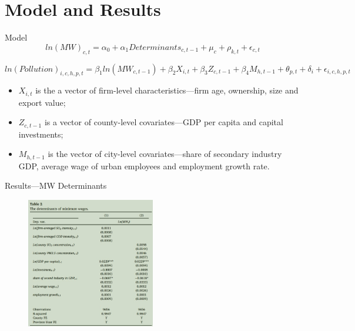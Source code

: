 \documentclass[aspectratio = 169]{beamer}
\begin{document}
%        


    \section{Model and Results}\label{sec:model-and-results}
    \begin{frame}{Model}
        \begin{equation}
            ln(MW)_{c,t} = \alpha_0 + \alpha_{1}Determinants_{c,t-1} + \mu_c + \rho_{k,t} + \epsilon_{c,t}\label{eq:determinants-mw}
        \end{equation}

        \begin{equation}
            ln(Pollution)_{i,c,h,p,t} = \beta_{1}ln(MW_{c,t-1}) + \beta_{2}X_{i,t} + \beta_{3}Z_{c,t-1} + \beta_{4}M_{h,t-1} + \theta_{p,t} + \delta_{i} + \epsilon_{i,c,h,p,t}\label{eq:model-mw}
        \end{equation}

        \begin{itemize}
            \item $X_{i,t}$ is the a vector of firm-level characteristics---firm age, ownership, size and export value;
            \item $Z_{c,t-1}$ is a vector of county-level covariates---GDP per capita and capital investments;
            \item $M_{h,t-1}$ is the vector of city-level covariates---share of secondary industry GDP, average wage of urban employees and employment growth rate.
        \end{itemize}
    \end{frame}

    \begin{frame}{Results---MW Determinants}
        \begin{figure}
            \centering
            \includegraphics[width = 0.5\textwidth, height = 0.9\textheight]{climate_change/beamer/det}
            \label{fig:determinants-mw}
        \end{figure}
    \end{frame}
\end{document}
